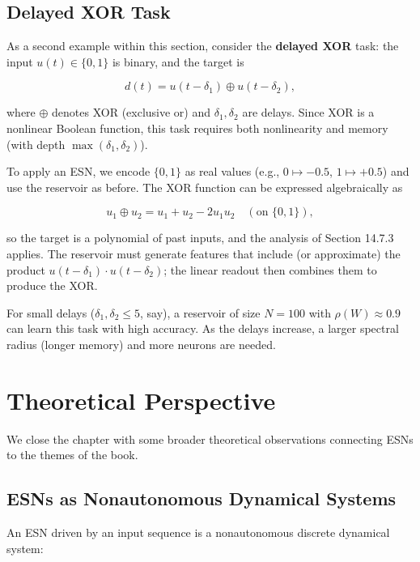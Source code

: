 \subsection{Delayed XOR Task}\label{sec:14.7.5}

As a second example within this section, consider the \textbf{delayed XOR} task: the input $u(t) \in \{0, 1\}$ is binary, and the target is

\begin{equation}\label{eq:14.14}\tag{14.14}
d(t) = u(t-\delta_1) \oplus u(t-\delta_2),
\end{equation}

where $\oplus$ denotes XOR (exclusive or) and $\delta_1, \delta_2$ are delays. Since XOR is a nonlinear Boolean function, this task requires both nonlinearity and memory (with depth $\max(\delta_1, \delta_2)$).

To apply an ESN, we encode $\{0,1\}$ as real values (e.g., $0 \mapsto -0.5$, $1 \mapsto +0.5$) and use the reservoir as before. The XOR function can be expressed algebraically as

\[
u_1 \oplus u_2 = u_1 + u_2 - 2 u_1 u_2 \quad (\text{on } \{0, 1\}),
\]

so the target is a polynomial of past inputs, and the analysis of Section 14.7.3 applies. The reservoir must generate features that include (or approximate) the product $u(t-\delta_1) \cdot u(t-\delta_2)$; the linear readout then combines them to produce the XOR.

For small delays ($\delta_1, \delta_2 \leq 5$, say), a reservoir of size $N = 100$ with $\rho(W) \approx 0.9$ can learn this task with high accuracy. As the delays increase, a larger spectral radius (longer memory) and more neurons are needed.


\bigskip


\section{Theoretical Perspective}\label{sec:14.8}

We close the chapter with some broader theoretical observations connecting ESNs to the themes of the book.

\subsection{ESNs as Nonautonomous Dynamical Systems}\label{sec:14.8.1}

An ESN driven by an input sequence is a nonautonomous discrete dynamical system:

